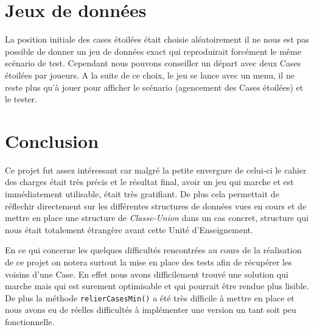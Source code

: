 \documentclass{article}
\newcommand{\info}{\texttt}
\begin{document}
\section{Jeux de données}

    La position initiale des cases étoilées était choisie aléatoirement il ne nous est pas possible de donner un jeu de données exact qui reproduirait forcément le même scénario de test. Cependant nous pouvons conseiller un départ avec deux Cases étoilées par joueurs. A la suite de ce choix, le jeu se lance avec un menu, il ne reste plus qu'à jouer pour afficher le scénario (agencement des Cases étoilées) et le tester.

\section{Conclusion}

    Ce projet fut assez intéressant car malgré la petite envergure de celui-ci le cahier des charges était très précis et le résultat final, avoir un jeu qui marche et est immédiatement utilisable, était très gratifiant. De plus cela permettait de réflechir directement sur les différentes structures de données vues en cours et de mettre en place une structure de \emph{Classe-Union} dans un cas concret, structure qui nous était totalement étrangère avant cette Unité d'Enseignement.
    
    En ce qui concerne les quelques difficultés rencontrées au cours de la réalisation de ce projet on notera surtout la mise en place des tests afin de récupérer les voisins d'une Case. En effet nous avons difficilement trouvé une solution qui marche mais qui est surement optimisable et qui pourrait être rendue plus lisible. De plus la méthode \info{relierCasesMin()} a été très difficile à mettre en place et nous avons eu de réelles difficultés à implémenter une version un tant soit peu fonctionnelle.
\end{document}
